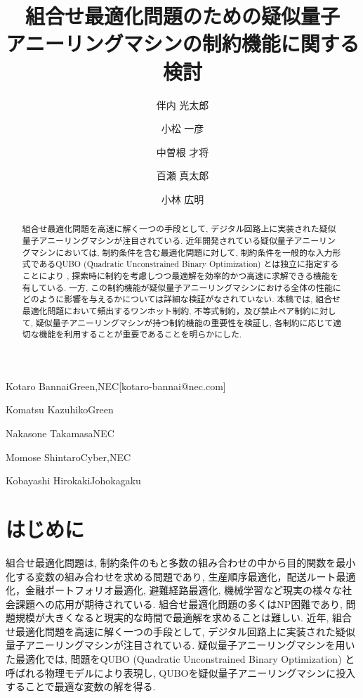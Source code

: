 \documentclass[submit,techrep,noauthor]{ipsj}
\begin{document}
\title{組合せ最適化問題のための疑似量子\\アニーリングマシンの制約機能に関する検討}


\author{伴内 光太郎}{Kotaro Bannai}{Green,NEC}[kotaro-bannai@nec.com]
\author{小松 一彦}{Komatsu Kazuhiko}{Green}
\author{中曽根 才将}{Nakasone Takamasa}{NEC}
\author{百瀬 真太郎}{Momose Shintaro}{Cyber,NEC}
\author{小林 広明}{Kobayashi Hirokaki}{Johokagaku}

\begin{abstract}
組合せ最適化問題を高速に解く一つの手段として, デジタル回路上に実装された疑似量子アニーリングマシンが注目されている. 近年開発されている疑似量子アニーリングマシンにおいては, 制約条件を含む最適化問題に対して, 制約条件を一般的な入力形式であるQUBO (Quadratic Unconstrained Binary Optimization) とは独立に指定することにより
, 探索時に制約を考慮しつつ最適解を効率的かつ高速に求解できる機能を有している. 一方, この制約機能が疑似量子アニーリングマシンにおける全体の性能にどのように影響を与えるかについては詳細な検証がなされていない. 本稿では, 組合せ最適化問題において頻出するワンホット制約, 不等式制約，及び禁止ペア制約に対して, 疑似量子アニーリングマシンが持つ制約機能の重要性を検証し, 各制約に応じて適切な機能を利用することが重要であることを明らかにした.
\end{abstract}

\maketitle

\section{はじめに}
組合せ最適化問題は, 制約条件のもと多数の組み合わせの中から目的関数を最小化する変数の組み合わせを求める問題であり, 生産順序最適化\cite{jobshop}，配送ルート最適化\cite{isc-onoda}，金融ポートフォリオ最適化\cite{portfolio}, 避難経路最適化\cite{tsunami}, 機械学習\cite{ml}など現実の様々な社会課題への応用が期待されている. 組合せ最適化問題の多くはNP困難であり, 問題規模が大きくなると現実的な時間で最適解を求めることは難しい. 近年, 組合せ最適化問題を高速に解く一つの手段として, デジタル回路上に実装された疑似量子アニーリングマシンが注目されている. 疑似量子アニーリングマシンを用いた最適化では, 問題をQUBO (Quadratic Unconstrained Binary Optimization) と呼ばれる物理モデルにより表現し, QUBOを疑似量子アニーリングマシンに投入することで最適な変数の解を得る.
\end{document}
